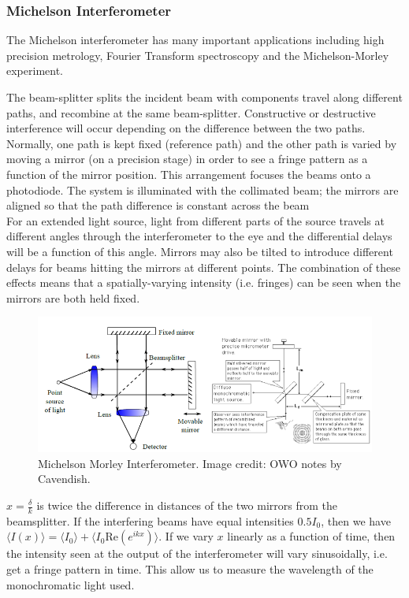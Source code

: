 \documentclass[a4paper]{article}
\begin{document}
\subsubsection*{Michelson Interferometer}
The Michelson interferometer has many important applications including high precision metrology, Fourier Transform spectroscopy and the Michelson-Morley experiment.
\begin{Note}[Setup]
The beam-splitter splits the incident beam with components travel along different paths, and recombine at the same beam-splitter. Constructive or destructive interference will occur depending on the difference between the two paths. Normally, one path is kept fixed (reference path) and the other path is varied by moving a mirror (on a precision stage) in order to see a fringe pattern as a function of the mirror position. This arrangement focuses the beams onto a photodiode. The system is illuminated with the collimated beam; the mirrors are aligned so that the path difference is constant across the beam\\[5pt]
For an extended light source, light from different parts of the source travels at different angles through the interferometer to the eye and the differential delays will be a function of this angle. Mirrors may also be tilted to introduce different delays for beams hitting the mirrors at different points. The combination of these effects means that a spatially-varying intensity (i.e. fringes) can be seen when the mirrors are both held fixed.
\end{Note}
\begin{figure}[H]
    \centering
    \includegraphics[width=\linewidth]{mmi.PNG}
    \caption{Michelson Morley Interferometer. Image credit: OWO notes by Cavendish.}
\end{figure}
\begin{Note} $x=\frac{\delta}{k}$ is twice the difference in distances of the two mirrors from the beamsplitter. If the interfering beams have equal intensities $0.5 I_0$, then we have $\langle I(x)\rangle=\langle I_0\rangle+\langle I_0\text{Re}(e^{ikx})\rangle$. If we vary $x$ linearly as a function of time, then the intensity seen at the output of the interferometer will vary sinusoidally, i.e. get a fringe pattern in time. This allow us to measure the wavelength of the monochromatic light used.
\end{Note}
\end{document}
